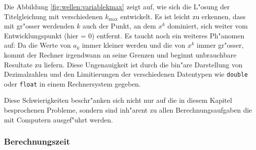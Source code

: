 Die Abbildung \ref{fig:wellen:variablekmax} zeigt auf, wie sich die L"osung 
der Titelgleichung mit verschiedenen $k_{\text{max}}$ entwickelt. Es ist leicht 
zu erkennen, dass mit gr"osser werdenden $k$ auch der Punkt, an dem $x^k$ 
dominiert, sich weiter vom Entwicklungspunkt (hier = 0) entfernt. Es taucht 
noch ein weiteres Ph"anomen auf: Da die Werte von $a_k$ immer kleiner werden 
und die von $x^k$ immer gr"osser, kommt der Rechner irgendwann an seine Grenzen 
und beginnt unbrauchbare Resultate zu liefern. Diese Ungenauigkeit ist durch 
die bin"are Darstellung von Dezimalzahlen und den Limitierungen der 
verschiedenen Datentypen wie \texttt{double} oder \texttt{float} in einem 
Rechnersystem gegeben.

Diese Schwierigkeiten beschr"anken sich nicht nur auf die in diesem Kapitel 
besprochenen Probleme, sondern sind inh"arent zu allen Berechnungsaufgaben die 
mit Computern ausgef"uhrt werden.

\subsubsection{Berechnungszeit}



